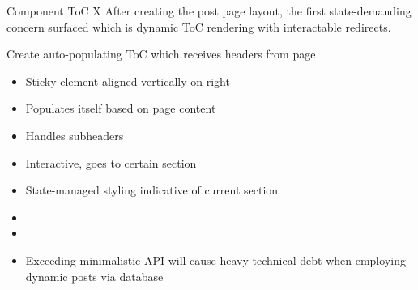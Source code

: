 \documentclass[7px]{article}
\begin{document}
\frontmatter
{Component}
{ToC}
{X}
{After creating the post page layout, the first state-demanding concern surfaced which is dynamic ToC rendering with interactable redirects.}

\strategy
{
  Create auto-populating ToC which receives headers from page
}
{
  \begin{enumerate}
      \small
      \begin{itemize}[label=$\multimapdotinv$, leftmargin=1.7mm]
        \item Sticky element aligned vertically on right
        \item Populates itself based on page content
        \item Handles subheaders
        \item Interactive, goes to certain section
        \item State-managed styling indicative of current section
      \end{itemize}
      \normalsize
  \end{enumerate}
}
{
  \small
  \begin{itemize}[label=$\multimapdotinv$]
    \item {}
    \item {}
  \end{itemize}
  \normalsize
}
{
  \small
  \begin{itemize}[label=\blitzb]
    \item Exceeding minimalistic API will cause heavy technical debt when employing dynamic posts via database
  \end{itemize}
  \normalsize
}
\end{document}
